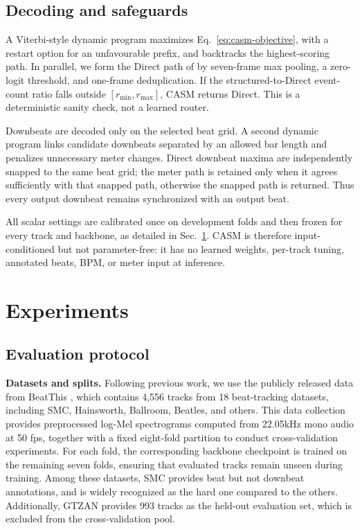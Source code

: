 \documentclass{article}
\begin{document}
\subsection{Decoding and safeguards}

A Viterbi-style dynamic program maximizes Eq.~\eqref{eq:casm-objective}, with a
restart option for an unfavourable prefix, and backtracks the highest-scoring
path. In parallel, we form the Direct path of \cite{foscarin2024beat} by
seven-frame max pooling, a zero-logit threshold, and one-frame deduplication.
If the structured-to-Direct event-count ratio falls outside
$[r_{\min},r_{\max}]$, CASM returns Direct. This is a deterministic sanity
check, not a learned router.

Downbeats are decoded only on the selected beat grid. A second dynamic program
links candidate downbeats separated by an allowed bar length and penalizes
unnecessary meter changes. Direct downbeat maxima are independently snapped to
the same beat grid; the meter path is retained only when it agrees sufficiently
with that snapped path, otherwise the snapped path is returned. Thus every
output downbeat remains synchronized with an output beat.

All scalar settings are calibrated once on development folds and then frozen
for every track and backbone, as detailed in Sec.~\ref{sec:exp}. CASM is
therefore input-conditioned but not parameter-free: it has no learned weights,
per-track tuning, annotated beats, BPM, or meter input at inference.



\section{Experiments}
\label{sec:exp}

\subsection{Evaluation protocol}
\textbf{Datasets and splits.} Following previous work, we use the publicly released data from BeatThis \cite{foscarin2024beat}, which contains 4,556 tracks from 18 beat-tracking datasets, including SMC, Hainsworth, Ballroom, Beatles, and others. This data collection provides preprocessed log-Mel spectrograms computed from 22.05kHz mono audio at 50 fps, together with a fixed eight-fold partition to conduct cross-validation experiments. For each fold, the corresponding backbone checkpoint is trained on the remaining seven folds, ensuring that evaluated tracks remain unseen during training. Among these datasets, SMC provides beat but not downbeat annotations, and is widely recognized as the hard one compared to the others. Additionally, GTZAN provides 993 tracks as the held-out evaluation set, which is excluded from the cross-validation pool.
\end{document}
